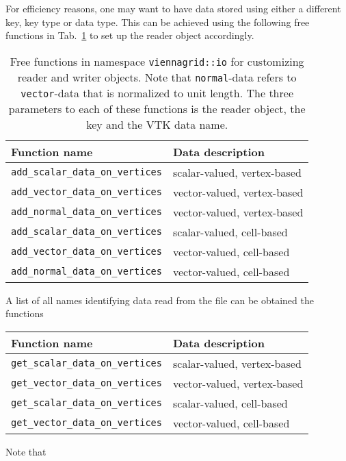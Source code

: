  For efficiency reasons, one may want to have data stored using either a different key, key type or data type.
 This can be achieved using the following free functions in Tab.~\ref{tab:customizing-io} to set up the reader object accordingly.

 \begin{table}[tb]
 \begin{center}
  \begin{tabular}{|l|l|}
   \hline
   Function name & Data description \\
   \hline
   \lstinline|add_scalar_data_on_vertices| & scalar-valued, vertex-based \\
   \lstinline|add_vector_data_on_vertices| & vector-valued, vertex-based \\
   \lstinline|add_normal_data_on_vertices| & vector-valued, vertex-based \\
   \hline
   \lstinline|add_scalar_data_on_vertices| & scalar-valued, cell-based \\
   \lstinline|add_vector_data_on_vertices| & vector-valued, cell-based \\
   \lstinline|add_normal_data_on_vertices| & vector-valued, cell-based \\
   \hline
  \end{tabular}
 \end{center}
 \caption{Free functions in namespace \lstinline|viennagrid::io| for customizing reader and writer objects. Note that \lstinline|normal|-data refers to \lstinline|vector|-data that is normalized to unit length. The three parameters to each of these functions is the reader object, the {\ViennaData} key and the VTK data name.}
 \label{tab:customizing-io}
 \end{table}
 



 A list of all names identifying data read from the file can be obtained the functions
 \begin{center}
  \begin{tabular}{|l|l|}
   \hline
   Function name & Data description \\
   \hline
   \lstinline|get_scalar_data_on_vertices| & scalar-valued, vertex-based \\
   \lstinline|get_vector_data_on_vertices| & vector-valued, vertex-based \\
   \hline
   \lstinline|get_scalar_data_on_vertices| & scalar-valued, cell-based \\
   \lstinline|get_vector_data_on_vertices| & vector-valued, cell-based \\
   \hline
  \end{tabular}
 \end{center}
 Note that 

